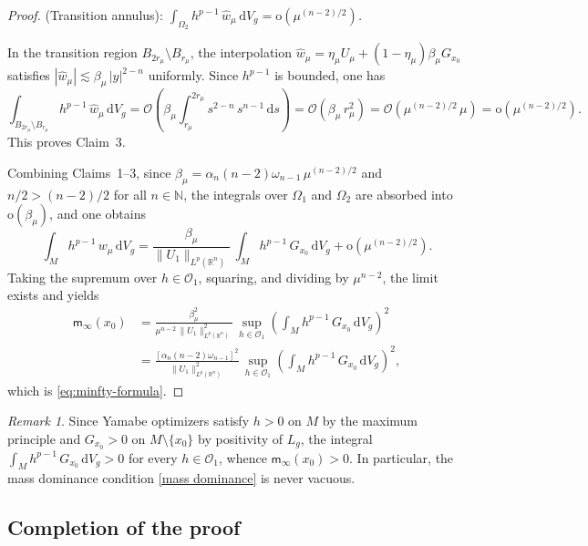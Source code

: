 \documentclass[reqno,11pt]{amsart}
\numberwithin{equation}{section}
\theoremstyle{definition}
\theoremstyle{remark}
\newtheorem{remark}[theorem]{Remark}
\newcommand{\ud}{\,\mathrm{d}}
\newcommand{\R}{\mathbb{R}}
\begin{document}
\begin{proof}
\medskip
{} {\rm (Transition annulus):} {\it $\int_{\Omega_2} h^{p-1}\, \hat{w}_\mu \ud V_g = \mathrm{o}(\mu^{(n-2)/2})$.}

\smallskip
{} In the transition region $B_{2r_\mu} \setminus B_{r_\mu}$, the interpolation $\hat{w}_\mu = \eta_\mu U_\mu + (1 - \eta_\mu)\beta_\mu G_{x_0}$ satisfies $|\hat{w}_\mu| \lesssim \beta_\mu\, |y|^{2-n}$ uniformly. Since $h^{p-1}$ is bounded, one has
\[
\int_{B_{2r_\mu} \setminus B_{r_\mu}} h^{p-1}\, \hat{w}_\mu \ud V_g = \mathcal{O}\!\left(\beta_\mu \int_{r_\mu}^{2r_\mu} s^{2-n}\, s^{n-1} \ud s\right) = \mathcal{O}(\beta_\mu\, r_\mu^2) = \mathcal{O}(\mu^{(n-2)/2}\, \mu) = \mathrm{o}(\mu^{(n-2)/2}).
\]
This proves Claim~3.

\medskip
Combining Claims~1--3, since $\beta_\mu = \alpha_n(n-2)\omega_{n-1}\, \mu^{(n-2)/2}$ and 
$n/2 > (n-2)/2$ for all $n\in\mathbb{N}$,
the integrals over $\Omega_1$ and $\Omega_2$ are absorbed into $\mathrm{o}(\beta_\mu)$, and one obtains
\[
\int_M h^{p-1}\, w_\mu \ud V_g = \frac{\beta_\mu}{\|U_1\|_{L^p(\R^n)}}\, \int_M h^{p-1}\, G_{x_0} \ud V_g + \mathrm{o}(\mu^{(n-2)/2}).
\]
Taking the supremum over $h \in \mathscr{O}_1$, squaring, and dividing by $\mu^{n-2}$, the limit exists and yields
\begin{align*}
    \mathsf{m}_\infty(x_0) &= \frac{\beta_\mu^2}{\mu^{n-2}\,\|U_1\|_{L^p(\R^n)}^2}\, \sup_{h \in \mathscr{O}_1} \left(\int_M h^{p-1}\, G_{x_0} \ud V_g\right)^2 \\
    &= \frac{[\alpha_n(n-2)\omega_{n-1}]^2}{\|U_1\|_{L^p(\R^n)}^2}\, \sup_{h \in \mathscr{O}_1} \left(\int_M h^{p-1}\, G_{x_0} \ud V_g\right)^2,
\end{align*}
which is \eqref{eq:minfty-formula}.
\end{proof}

\begin{remark}
\label{rmk:moment-positive}
Since Yamabe optimizers satisfy $h > 0$ on $M$ by the maximum principle and $G_{x_0} > 0$ on $M \setminus \{x_0\}$ by positivity of $L_g$, the integral $\int_M h^{p-1}\, G_{x_0} \ud V_g > 0$ for every $h \in \mathscr{O}_1$, whence $\mathsf{m}_\infty(x_0) > 0$. In particular, the mass dominance condition \eqref{mass dominance} is never vacuous.
\end{remark}

\subsection{Completion of the proof}
\end{document}
